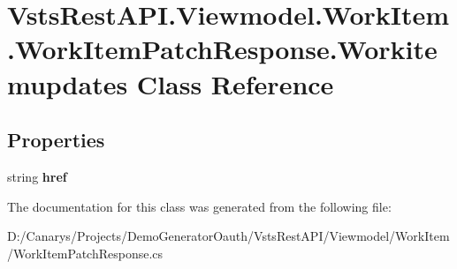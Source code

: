 \hypertarget{class_vsts_rest_a_p_i_1_1_viewmodel_1_1_work_item_1_1_work_item_patch_response_1_1_workitemupdates}{}\section{Vsts\+Rest\+A\+P\+I.\+Viewmodel.\+Work\+Item.\+Work\+Item\+Patch\+Response.\+Workitemupdates Class Reference}
\label{class_vsts_rest_a_p_i_1_1_viewmodel_1_1_work_item_1_1_work_item_patch_response_1_1_workitemupdates}
\subsection*{Properties}
\begin{DoxyCompactItemize}
\item 
\mbox{\label{class_vsts_rest_a_p_i_1_1_viewmodel_1_1_work_item_1_1_work_item_patch_response_1_1_workitemupdates_a366e011e5aefe86b97ef996b0a85835a}} 
string {\bfseries href}
\end{DoxyCompactItemize}


The documentation for this class was generated from the following file\+:\begin{DoxyCompactItemize}
\item 
D\+:/\+Canarys/\+Projects/\+Demo\+Generator\+Oauth/\+Vsts\+Rest\+A\+P\+I/\+Viewmodel/\+Work\+Item/Work\+Item\+Patch\+Response.\+cs\end{DoxyCompactItemize}
